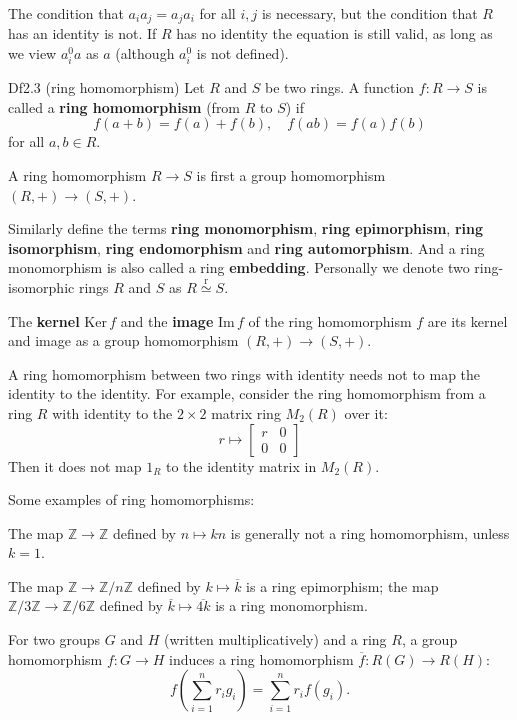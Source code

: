 \documentclass{article}
\newcommand{\Ker}{\text{Ker}\,}
\newcommand{\Ima}{\text{Im}\,}
\newcommand{\Riso}{\overset{\text{r}}{\simeq}}
\begin{document}
\begin{Rmk}{}
    The condition that $a_i a_j = a_j a_i$ for all $i, j$ is necessary, but the condition that $R$ has an identity is not. If $R$ has no identity the equation is still valid, as long as we view $a_i^0 a$ as $a$ (although $a_i^0$ is not defined). 
\end{Rmk}

\begin{Df}{Df2.3 (ring homomorphism)}
    Let $R$ and $S$ be two rings. A function $f: R \to S$ is called a \textbf{ring homomorphism} (from $R$ to $S$) if
    $$ f(a+b) = f(a) + f(b), \quad f(ab) = f(a)f(b) $$
    for all $a, b \in R$. 
\end{Df}

\begin{Rmk}{}
    \begin{compactenum}
        \item \textcolor{Th}{A ring homomorphism $R\to S$ is first a group homomorphism $(R, +) \to (S, +)$.}
        \item \textcolor{Df}{Similarly define the terms \textbf{ring monomorphism}, \textbf{ring epimorphism}, \textbf{ring isomorphism}, \textbf{ring endomorphism} and \textbf{ring automorphism}.} And \textcolor{Df}{a ring monomorphism is also called a ring \textbf{embedding}.} \textcolor{Df}{Personally we denote two ring-isomorphic rings $R$ and $S$ as $R \Riso S$.}
        \item \textcolor{Df}{The \textbf{kernel} $\Ker f$ and the \textbf{image} $\Ima f$ of the ring homomorphism $f$ are its kernel and image as a group homomorphism $(R, +) \to (S, +)$.}
        \item \textcolor{Th}{A ring homomorphism between two rings with identity needs not to map the identity to the identity.} For example, consider the ring homomorphism from a ring $R$ with identity to the $2\times 2$ matrix ring $M_2(R)$ over it:
        $$ r\mapsto \begin{bmatrix}
            r & 0 \\
            0 & 0 
        \end{bmatrix} $$
        Then it does not map $1_R$ to the identity matrix in $M_2(R)$. 
    \end{compactenum}
    Some examples of ring homomorphisms:
    \begin{compactenum}
        \item \textcolor{Th}{The map $\mathbb{Z} \to \mathbb{Z}$ defined by $n\mapsto kn$ is generally not a ring homomorphism, unless $k = 1$.}
        \item \textcolor{Th}{The map $\mathbb{Z} \to \mathbb{Z}/n\mathbb{Z}$ defined by $k\mapsto \overline{k}$ is a ring epimorphism; the map $\mathbb{Z}/3\mathbb{Z} \to \mathbb{Z}/6\mathbb{Z}$ defined by $\overline{k}\mapsto \overline{4k}$ is a ring monomorphism.}
        \item \textcolor{Th}{For two groups $G$ and $H$ (written multiplicatively) and a ring $R$, a group homomorphism $f: G \to H$ induces a ring homomorphism $\overline{f}: R(G) \to R(H)$:
        $$ f\left(\sum_{i=1}^n r_i g_i\right) = \sum_{i=1}^n r_i f(g_i). $$}
    \end{compactenum}
\end{Rmk}
\end{document}
